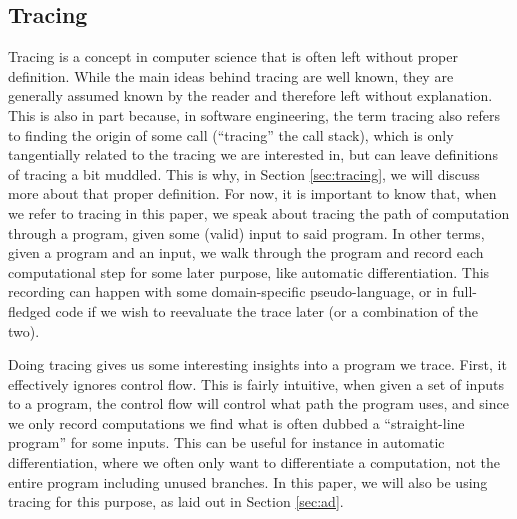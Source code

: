     \subsection{Tracing}
        Tracing is a concept in computer science that is often left without proper definition.
        While the main ideas behind tracing are well known, they are generally assumed known by the reader and therefore left without explanation.
        This is also in part because, in software engineering, the term tracing also refers to finding the origin of some call (``tracing'' the call stack), which is only tangentially related to the tracing we are interested in, but can leave definitions of tracing a bit muddled.
        This is why, in Section \ref{sec:tracing}, we will discuss more about that proper definition.
        For now, it is important to know that, when we refer to tracing in this paper, we speak about tracing the path of computation through a program, given some (valid) input to said program.
        In other terms, given a program and an input, we walk through the program and record each computational step for some later purpose, like automatic differentiation.
        This recording can happen with some domain-specific pseudo-language, or in full-fledged code if we wish to reevaluate the trace later (or a combination of the two).

        Doing tracing gives us some interesting insights into a program we trace.
        First, it effectively ignores control flow.
        This is fairly intuitive, when given a set of inputs to a program, the control flow will control what path the program uses, and since we only record computations we find what is often dubbed a ``straight-line program'' for some inputs.
        This can be useful for instance in automatic differentiation, where we often only want to differentiate a computation, not the entire program including unused branches.
        In this paper, we will also be using tracing for this purpose, as laid out in Section \ref{sec:ad}.

